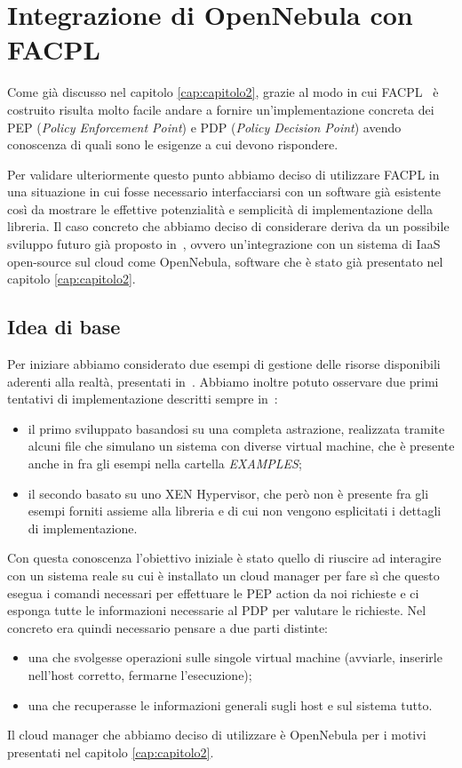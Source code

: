 
\chapter{Integrazione di OpenNebula con FACPL}
\label{cap:capitolo3}
Come già discusso nel capitolo \ref{cap:capitolo2}, grazie al modo in cui FACPL~\cite{facpl} è costruito risulta molto facile andare a fornire un'implementazione concreta dei PEP (\emph{Policy Enforcement Point}) e PDP (\emph{Policy Decision Point}) avendo conoscenza  di quali sono le esigenze a cui devono rispondere.\par
Per validare ulteriormente questo punto abbiamo deciso di utilizzare FACPL in una situazione in cui fosse necessario interfacciarsi con un software già esistente così da mostrare le effettive potenzialità e semplicità di implementazione della libreria.
Il caso concreto che abbiamo deciso di considerare deriva da un possibile sviluppo futuro già proposto in~\cite{10.1007/978-3-319-08260-8_6}, ovvero un'integrazione con un sistema di IaaS open-source sul cloud come OpenNebula\cite{opennebula}, software che è stato già presentato nel capitolo \ref{cap:capitolo2}.

\section{Idea di base}
Per iniziare abbiamo considerato due esempi di gestione delle risorse disponibili aderenti alla realtà, presentati in~\cite{10.1007/978-3-319-08260-8_6}.
Abbiamo inoltre potuto osservare due primi tentativi di implementazione descritti sempre in~\cite{10.1007/978-3-319-08260-8_6}:
\begin{itemize}
    \item il primo sviluppato basandosi su una completa astrazione, realizzata tramite alcuni file che simulano un sistema con diverse virtual machine, che è presente anche in \cite{facpl-github} fra gli esempi nella cartella \emph{EXAMPLES};
    \item il secondo basato su uno XEN Hypervisor, che però non è presente fra gli esempi forniti assieme alla libreria e di cui non vengono esplicitati i dettagli di implementazione.
\end{itemize}
Con questa conoscenza l'obiettivo iniziale è stato quello di riuscire ad interagire con un sistema reale su cui è installato un cloud manager per fare sì che questo esegua i comandi necessari per effettuare le PEP action da noi richieste e ci esponga tutte le informazioni necessarie al PDP per valutare le richieste.
Nel concreto era quindi necessario pensare a due parti distinte:
\begin{itemize}
    \item una che svolgesse operazioni sulle singole virtual machine (avviarle, inserirle nell'host corretto, fermarne l'esecuzione);
    \item una che recuperasse le informazioni generali sugli host e sul sistema tutto.
\end{itemize}
Il cloud manager che abbiamo deciso di utilizzare è OpenNebula per i motivi presentati nel capitolo \ref{cap:capitolo2}.

